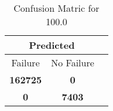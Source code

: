 \begin{table}[] 
\caption{Confusion Matric for 100.0} 
\label{Table: Prediction Accuracy-None100.0100.0EKF-resetReflection-Reflection} 
\centering 
\begin{tabular} 
 {@{}ccc@{}} 
\toprule 
\multicolumn{2}{c}{\textbf{Predicted}}
 \\ \midrule 
\multicolumn{1}{|c|}{Failure} & 
\multicolumn{1}{c|}{No Failure}
 \\ \midrule 
\multicolumn{1}{|c|}{\color{green}\textbf{162725}} & 
\multicolumn{1}{c|}{\color{red}\textbf{0}}
 \\ \midrule 
\multicolumn{1}{|c|}{\color{red}\textbf{0}} & 
\multicolumn{1}{c|}{\color{green}\textbf{7403}}
 \\ \bottomrule 
\end{tabular} 
\end{table} 
